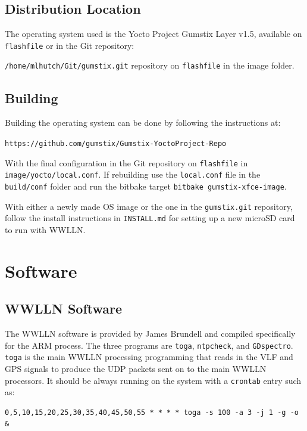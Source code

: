 \subsection{Distribution Location}
\label{app:gum:distribution}
The operating system used is the Yocto Project Gumstix Layer v1.5, available on \texttt{flashfile} or in the Git repository:

\texttt{/home/mlhutch/Git/gumstix.git} repository on \texttt{flashfile} in the image folder.

\subsection{Building}

Building the operating system can be done by following the instructions at:

\texttt{https://github.com/gumstix/Gumstix-YoctoProject-Repo}

With the final configuration in the Git repository on \texttt{flashfile} in \texttt{image/yocto/local.conf}.
If rebuilding use the \texttt{local.conf} file in the \texttt{build/conf} folder and run the bitbake target \texttt{bitbake gumstix-xfce-image}.

With either a newly made OS image or the one in the \texttt{gumstix.git} repository, follow the install instructions in \texttt{INSTALL.md} for setting up a new microSD card to run with WWLLN.

\section{Software}

\subsection{WWLLN Software}

The WWLLN software is provided by James Brundell and compiled specifically for the ARM process.
The three programs are \texttt{toga}, \texttt{ntpcheck}, and \texttt{GDspectro}.
\texttt{toga} is the main WWLLN processing programming that reads in the VLF and GPS signals to produce the UDP packets sent on to the main WWLLN processors.
It should be always running on the system with a \texttt{crontab} entry such as:

\begin{verbatim}
0,5,10,15,20,25,30,35,40,45,50,55 * * * * toga -s 100 -a 3 -j 1 -g -o &
\end{verbatim}

